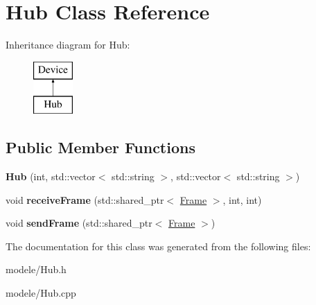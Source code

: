 \hypertarget{class_hub}{\section{Hub Class Reference}
\label{class_hub}
}
Inheritance diagram for Hub\-:\begin{figure}[H]
\begin{center}
\leavevmode
\includegraphics[height=2.000000cm]{class_hub}
\end{center}
\end{figure}
\subsection*{Public Member Functions}
\begin{DoxyCompactItemize}
\item 
\hypertarget{class_hub_ae8e91abc40bc649239f6897dd8a03da2}{{\bfseries Hub} (int, std\-::vector$<$ std\-::string $>$, std\-::vector$<$ std\-::string $>$)}\label{class_hub_ae8e91abc40bc649239f6897dd8a03da2}

\item 
\hypertarget{class_hub_af9f7b013e74d6f5463c5813fbcece9ae}{void {\bfseries receive\-Frame} (std\-::shared\-\_\-ptr$<$ \hyperlink{class_frame}{Frame} $>$, int, int)}\label{class_hub_af9f7b013e74d6f5463c5813fbcece9ae}

\item 
\hypertarget{class_hub_a6ae83b6150a0b8f05e3c47f89af41d5c}{void {\bfseries send\-Frame} (std\-::shared\-\_\-ptr$<$ \hyperlink{class_frame}{Frame} $>$)}\label{class_hub_a6ae83b6150a0b8f05e3c47f89af41d5c}

\end{DoxyCompactItemize}


The documentation for this class was generated from the following files\-:\begin{DoxyCompactItemize}
\item 
modele/Hub.\-h\item 
modele/Hub.\-cpp\end{DoxyCompactItemize}
